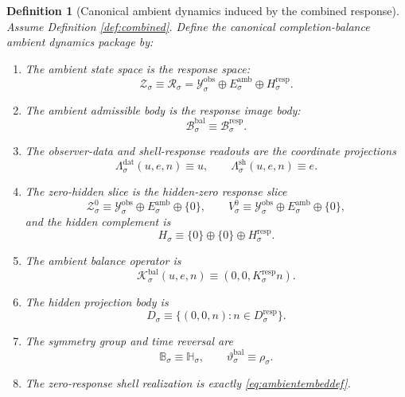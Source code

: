 \documentclass[11pt]{article}
\newcommand{\DataSpace}[1]{\mathcal Y_{#1}^{\mathrm{obs}}}
\newcommand{\AmbientTarget}[1]{E_{#1}^{\mathrm{amb}}}
\newcommand{\BalSpace}[1]{\mathcal Z_{#1}}
\newcommand{\BalBody}[1]{\mathcal B_{#1}^{\mathrm{bal}}}
\newcommand{\BalData}[1]{\Lambda_{#1}^{\mathrm{dat}}}
\newcommand{\BalShell}[1]{\Lambda_{#1}^{\mathrm{sh}}}
\newcommand{\ZeroHiddenSlice}[1]{\mathcal Z_{#1}^{0}}
\newcommand{\ZeroHiddenVec}[1]{V_{#1}^{0}}
\newcommand{\BalOp}[1]{\mathcal K_{#1}^{\mathrm{bal}}}
\newcommand{\BalSym}[1]{\mathbb B_{#1}}
\newcommand{\BalTime}[1]{\vartheta_{#1}^{\mathrm{bal}}}
\newcommand{\GapSpace}[1]{H_{#1}}
\newcommand{\GapBody}[1]{D_{#1}}
\newcommand{\ResponseSpace}[1]{\mathcal R_{#1}}
\newcommand{\ResponseImage}[1]{\mathcal B_{#1}^{\mathrm{resp}}}
\newcommand{\RespGapSpace}[1]{H_{#1}^{\mathrm{resp}}}
\newcommand{\RespGapBody}[1]{D_{#1}^{\mathrm{resp}}}
\newcommand{\RespHiddenOperator}[1]{K_{#1}^{\mathrm{resp}}}
\newcommand{\ResponseSym}[1]{\mathbb H_{#1}}
\newcommand{\ResponseTime}[1]{\rho_{#1}}
\newtheorem{definition}{Definition}
\begin{document}
\begin{definition}[Canonical ambient dynamics induced by the combined response]
\label{def:canonical}
Assume Definition \ref{def:combined}. Define the canonical completion-balance ambient dynamics package by:
\begin{enumerate}
    \item The ambient state space is the response space:
    \[
    \BalSpace{\sigma}
    \equiv
    \ResponseSpace{\sigma}
    =
    \DataSpace{\sigma}\oplus \AmbientTarget{\sigma}\oplus \RespGapSpace{\sigma}.
    \]
    \item The ambient admissible body is the response image body:
    \[
    \BalBody{\sigma}\equiv \ResponseImage{\sigma}.
    \]
    \item The observer-data and shell-response readouts are the coordinate projections
    \begin{equation}
    \BalData{\sigma}(u,e,n)\equiv u,
    \qquad
    \BalShell{\sigma}(u,e,n)\equiv e.
    \label{eq:ambientreadouts}
    \end{equation}
    \item The zero-hidden slice is the hidden-zero response slice
    \begin{equation}
    \ZeroHiddenSlice{\sigma}
    \equiv
    \DataSpace{\sigma}\oplus \AmbientTarget{\sigma}\oplus\{0\},
    \qquad
    \ZeroHiddenVec{\sigma}
    \equiv
    \DataSpace{\sigma}\oplus \AmbientTarget{\sigma}\oplus\{0\},
    \label{eq:zerohiddenslice}
    \end{equation}
    and the hidden complement is
    \begin{equation}
    \GapSpace{\sigma}
    \equiv
    \{0\}\oplus\{0\}\oplus \RespGapSpace{\sigma}.
    \label{eq:hiddenspace}
    \end{equation}
    \item The ambient balance operator is
    \begin{equation}
    \BalOp{\sigma}(u,e,n)\equiv (0,0,\RespHiddenOperator{\sigma}n).
    \label{eq:ambientbalanceop}
    \end{equation}
    \item The hidden projection body is
    \begin{equation}
    \GapBody{\sigma}
    \equiv
    \{(0,0,n):n\in\RespGapBody{\sigma}\}.
    \label{eq:hiddenset}
    \end{equation}
    \item The symmetry group and time reversal are
    \[
    \BalSym{\sigma}\equiv \ResponseSym{\sigma},
    \qquad
    \BalTime{\sigma}\equiv \ResponseTime{\sigma}.
    \]
    \item The zero-response shell realization is exactly \eqref{eq:ambientembeddef}.
\end{enumerate}
\end{definition}
\end{document}
